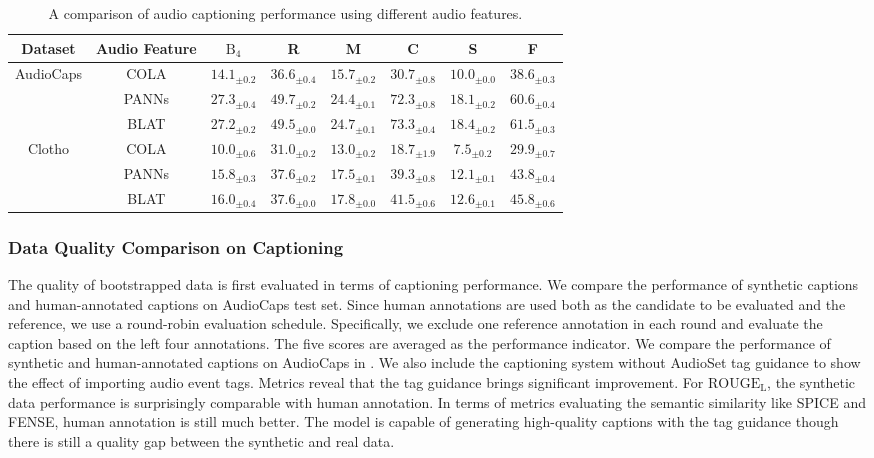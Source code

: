\documentclass[sigconf]{acmart}
\begin{document}
\begin{table}[ht]
    \centering
    \begin{tabular}{c|c||cccccc}
    \toprule
    Dataset & Audio Feature & $\text{B}_4$ & R & M & C & S & F\\
    \midrule
    \multirow{3}{*}{AudioCaps} & COLA & $14.1_{\pm 0.2}$ & $36.6_{\pm 0.4}$ & $15.7_{\pm 0.2}$ & $30.7_{\pm 0.8}$ & $10.0_{\pm 0.0}$ & $38.6_{\pm 0.3}$
    \\
    & PANNs & $\mathbf{27.3_{\pm 0.4}}$ & $\mathbf{49.7_{\pm 0.2}}$ & $24.4_{\pm 0.1}$ & $72.3_{\pm 0.8}$ & $18.1_{\pm 0.2}$ & $60.6_{\pm 0.4}$ \\
     & BLAT & $27.2_{\pm 0.2}$ & $49.5_{\pm 0.0}$ & $\mathbf{24.7_{\pm 0.1}}$ & $\mathbf{73.3_{\pm 0.4}}$ & $\mathbf{18.4_{\pm 0.2}}$ & $\mathbf{61.5_{\pm 0.3}}$ \\
    \midrule
    \multirow{3}{*}{Clotho} & COLA & $10.0_{\pm 0.6}$ & $31.0_{\pm 0.2}$ & $13.0_{\pm 0.2}$ & $18.7_{\pm 1.9}$ & $7.5_{\pm 0.2}$ & $29.9_{\pm 0.7}$\\
    & PANNs & $15.8_{\pm 0.3}$ & $\mathbf{37.6_{\pm 0.2}}$ & $17.5_{\pm 0.1}$ & $39.3_{\pm 0.8}$ & $12.1_{\pm 0.1}$ & $43.8_{\pm 0.4}$\\
     & BLAT & $\mathbf{16.0_{\pm 0.4}}$ & $\mathbf{37.6_{\pm 0.0}}$ & $\mathbf{17.8_{\pm 0.0}}$ & $\mathbf{41.5_{\pm 0.6}}$ & $\mathbf{12.6_{\pm 0.1}}$ & $\mathbf{45.8_{\pm 0.6}}$\\
    \bottomrule
    \end{tabular}
     \caption{A comparison of audio captioning performance using different audio features.}
    \label{tab:caption_finetune}
\end{table}

\subsubsection{Data Quality Comparison on Captioning}


The quality of bootstrapped data is first evaluated in terms of captioning performance.
We compare the performance of synthetic captions and human-annotated captions on AudioCaps test set.
Since human annotations are used both as the candidate to be evaluated and the reference, we use a round-robin evaluation schedule.
Specifically, we exclude one reference annotation in each round and evaluate the caption based on the left four annotations.
The five scores are averaged as the performance indicator.
We compare the performance of synthetic and human-annotated captions on AudioCaps in .
We also include the captioning system without AudioSet tag guidance to show the effect of importing audio event tags.
Metrics reveal that the tag guidance brings significant improvement.
For $\text{ROUGE}_\text{L}$, the synthetic data performance is surprisingly comparable with human annotation.
In terms of metrics evaluating the semantic similarity like SPICE and FENSE, human annotation is still much better.
The model is capable of generating high-quality captions with the tag guidance though there is still a quality gap between the synthetic and real data.
\end{document}

